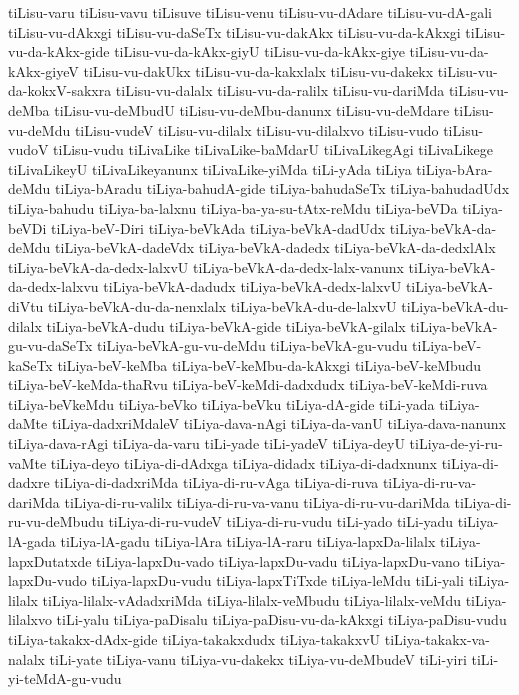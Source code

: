 {tiLisu-varu
tiLisu-vavu
tiLisuve
tiLisu-venu
tiLisu-vu-dAdare
tiLisu-vu-dA-gali
tiLisu-vu-dAkxgi
tiLisu-vu-daSeTx
tiLisu-vu-dakAkx
tiLisu-vu-da-kAkxgi
tiLisu-vu-da-kAkx-gide
tiLisu-vu-da-kAkx-giyU
tiLisu-vu-da-kAkx-giye
tiLisu-vu-da-kAkx-giyeV
tiLisu-vu-dakUkx
tiLisu-vu-da-kakxlalx
tiLisu-vu-dakekx
tiLisu-vu-da-kokxV-sakxra
tiLisu-vu-dalalx
tiLisu-vu-da-ralilx
tiLisu-vu-dariMda
tiLisu-vu-deMba
tiLisu-vu-deMbudU
tiLisu-vu-deMbu-danunx
tiLisu-vu-deMdare
tiLisu-vu-deMdu
tiLisu-vudeV
tiLisu-vu-dilalx
tiLisu-vu-dilalxvo
tiLisu-vudo
tiLisu-vudoV
tiLisu-vudu
tiLivaLike
tiLivaLike-baMdarU
tiLivaLikegAgi
tiLivaLikege
tiLivaLikeyU
tiLivaLikeyanunx
tiLivaLike-yiMda
tiLi-yAda
tiLiya
tiLiya-bAra-deMdu
tiLiya-bAradu
tiLiya-bahudA-gide
tiLiya-bahudaSeTx
tiLiya-bahudadUdx
tiLiya-bahudu
tiLiya-ba-lalxnu
tiLiya-ba-ya-su-tAtx-reMdu
tiLiya-beVDa
tiLiya-beVDi
tiLiya-beV-Diri
tiLiya-beVkAda
tiLiya-beVkA-dadUdx
tiLiya-beVkA-da-deMdu
tiLiya-beVkA-dadeVdx
tiLiya-beVkA-dadedx
tiLiya-beVkA-da-dedxlAlx
tiLiya-beVkA-da-dedx-lalxvU
tiLiya-beVkA-da-dedx-lalx-vanunx
tiLiya-beVkA-da-dedx-lalxvu
tiLiya-beVkA-dadudx
tiLiya-beVkA-dedx-lalxvU
tiLiya-beVkA-diVtu
tiLiya-beVkA-du-da-nenxlalx
tiLiya-beVkA-du-de-lalxvU
tiLiya-beVkA-du-dilalx
tiLiya-beVkA-dudu
tiLiya-beVkA-gide
tiLiya-beVkA-gilalx
tiLiya-beVkA-gu-vu-daSeTx
tiLiya-beVkA-gu-vu-deMdu
tiLiya-beVkA-gu-vudu
tiLiya-beV-kaSeTx
tiLiya-beV-keMba
tiLiya-beV-keMbu-da-kAkxgi
tiLiya-beV-keMbudu
tiLiya-beV-keMda-thaRvu
tiLiya-beV-keMdi-dadxdudx
tiLiya-beV-keMdi-ruva
tiLiya-beVkeMdu
tiLiya-beVko
tiLiya-beVku
tiLiya-dA-gide
tiLi-yada
tiLiya-daMte
tiLiya-dadxriMdaleV
tiLiya-dava-nAgi
tiLiya-da-vanU
tiLiya-dava-nanunx
tiLiya-dava-rAgi
tiLiya-da-varu
tiLi-yade
tiLi-yadeV
tiLiya-deyU
tiLiya-de-yi-ru-vaMte
tiLiya-deyo
tiLiya-di-dAdxga
tiLiya-didadx
tiLiya-di-dadxnunx
tiLiya-di-dadxre
tiLiya-di-dadxriMda
tiLiya-di-ru-vAga
tiLiya-di-ruva
tiLiya-di-ru-va-dariMda
tiLiya-di-ru-valilx
tiLiya-di-ru-va-vanu
tiLiya-di-ru-vu-dariMda
tiLiya-di-ru-vu-deMbudu
tiLiya-di-ru-vudeV
tiLiya-di-ru-vudu
tiLi-yado
tiLi-yadu
tiLiya-lA-gada
tiLiya-lA-gadu
tiLiya-lAra
tiLiya-lA-raru
tiLiya-lapxDa-lilalx
tiLiya-lapxDutatxde
tiLiya-lapxDu-vado
tiLiya-lapxDu-vadu
tiLiya-lapxDu-vano
tiLiya-lapxDu-vudo
tiLiya-lapxDu-vudu
tiLiya-lapxTiTxde
tiLiya-leMdu
tiLi-yali
tiLiya-lilalx
tiLiya-lilalx-vAdadxriMda
tiLiya-lilalx-veMbudu
tiLiya-lilalx-veMdu
tiLiya-lilalxvo
tiLi-yalu
tiLiya-paDisalu
tiLiya-paDisu-vu-da-kAkxgi
tiLiya-paDisu-vudu
tiLiya-takakx-dAdx-gide
tiLiya-takakxdudx
tiLiya-takakxvU
tiLiya-takakx-va-nalalx
tiLi-yate
tiLiya-vanu
tiLiya-vu-dakekx
tiLiya-vu-deMbudeV
tiLi-yiri
tiLi-yi-teMdA-gu-vudu
}
